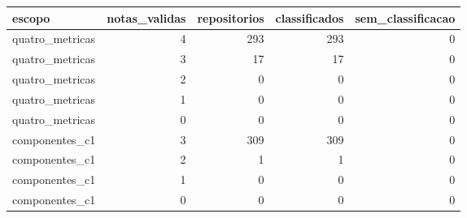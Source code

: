 \begin{tabular}{lrrrr}
\toprule
escopo & notas_validas & repositorios & classificados & sem_classificacao \\
\midrule
quatro_metricas & 4 & 293 & 293 & 0 \\
quatro_metricas & 3 & 17 & 17 & 0 \\
quatro_metricas & 2 & 0 & 0 & 0 \\
quatro_metricas & 1 & 0 & 0 & 0 \\
quatro_metricas & 0 & 0 & 0 & 0 \\
componentes_c1 & 3 & 309 & 309 & 0 \\
componentes_c1 & 2 & 1 & 1 & 0 \\
componentes_c1 & 1 & 0 & 0 & 0 \\
componentes_c1 & 0 & 0 & 0 & 0 \\
\bottomrule
\end{tabular}
